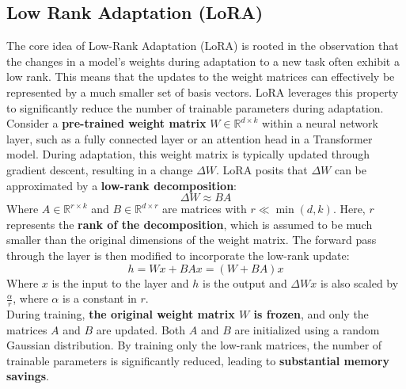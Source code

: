 \documentclass{article}
\begin{document}
	
	\subsection{Low Rank Adaptation (LoRA)}
	The core idea of Low-Rank Adaptation (LoRA) is rooted in the observation that the changes in a model's weights during adaptation to a new task often exhibit a low rank.
	This means that the updates to the weight matrices can effectively be represented by a much smaller set of basis vectors. LoRA leverages this property to significantly reduce the number of trainable parameters during adaptation. \\
	Consider a \textbf{pre-trained weight matrix} $W \in \mathbb{R}^{d \times k}$ within a neural network layer, such as a fully connected layer or an attention head in a Transformer model. During adaptation, this weight matrix is typically updated through gradient descent, resulting in a change $\Delta W$. LoRA posits that $\Delta W$ can be approximated by a \textbf{low-rank decomposition}:
	\begin{equation}
		\Delta W \approx B A
	\end{equation}
	Where $A \in \mathbb{R}^{r \times k}$ and $B \in \mathbb{R}^{d \times r}$ are matrices with $r \ll \min(d, k)$. Here, $r$ represents the \textbf{rank of the decomposition}, which is assumed to be much smaller than the original dimensions of the weight matrix.
	The forward pass through the layer is then modified to incorporate the low-rank update:
	\begin{equation}
	h = W x + B A x = (W + B A) x
	\end{equation}
	Where $x$ is the input to the layer and $h$ is the output and $\Delta W x$ is also scaled by $\frac{\alpha}{r}$, where $\alpha$ is a constant in $r$. \\
	During training, \textbf{the original weight matrix $W$ is frozen}, and only the matrices $A$ and $B$ are updated. Both $A$ and $B$ are initialized using a random Gaussian distribution.
	By training only the low-rank matrices, the number of trainable parameters is significantly reduced, leading to \textbf{substantial memory savings}.
	
\end{document}
